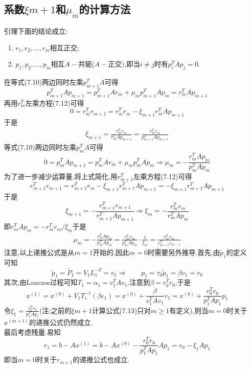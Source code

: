 \documentclass[12pt,a4paper]{article}
\begin{document}
\subsection*{\color{blue}系数$\xi m+1$和$\mu_{m}$的计算方法}
{\color{blue}引理}\qquad 下面的结论成立:
\begin{enumerate}[(1)]
	\item $r_{1}, r_{2}, \ldots, r_{m}$相互正交;
	\item $p_{1}, p_{2}, \dots, p_{m}$相互$A-$共轭($A-$正交),即当$i \neq j$时有$p_{i}^{T} A p_{j}=0$.
\end{enumerate}
在等式(7.10)两边同时左乘$p_{m+1}^{T} A$可得
$$
p_{m+1}^{T} A p_{m+1}=p_{m+1}^{T} A r_{m}+\mu_{m} p_{m+1}^{T} A p_{m}=r_{m}^{T} A p_{m+1}
$$
再用$r_{m}^{T}$左乘方程(7.12)可得
$$
0=r_{m}^{T} r_{m+1}=r_{m}^{T} r_{m}-\xi_{m+1} r_{m}^{T} A p_{m+1}
$$
于是
\begin{align*}
	\xi_{m+1}=\frac{r_{m}^{T} r_{m}}{r_{m}^{T} A p_{m+1}}=\frac{r_{m}^{T} r_{m}}{p_{m+1}^{T} A p_{m+1}}
	\tag{7.13}
\end{align*}
等式(7.10)两边同时左乘$p_{m}^{T} A$可得
$$
0=p_{m}^{T} A p_{m+1}=p_{m}^{T} A r_{m}+\mu_{m} p_{m}^{T} A p_{m} \Longrightarrow \mu_{m}=-\frac{r_{m}^{T} A p_{m}}{p_{m}^{T} A p_{m}}
$$
为了进一步减少运算量,将上式简化.用$r_{m+1}^{T}$左乘方程(7.12)可得
$$
r_{m+1}^{T} r_{m+1}=r_{m+1}^{T} r_{m}-\xi_{m+1} r_{m+1}^{T} A p_{m+1}=-\xi_{m+1} r_{m+1}^{T} A p_{m+1}
$$
于是
$$
\xi_{m+1}=-\frac{r_{m+1}^{T} r_{m+1}}{r_{m+1}^{T} A p_{m+1}} \Longrightarrow \xi_{m}=-\frac{r_{m}^{T} r_{m}}{r_{m}^{T} A p_{m}}
$$
即$r_{m}^{T} A p_{m}=-r_{m}^{T} r_{m} / \xi_{m}$于是
\begin{align*}
	\mu_{m}=-\frac{r_{m}^{T} A p_{m}}{p_{m}^{T} A p_{m}}=\frac{r_{m}^{T} r_{m}}{p_{m}^{T} A p_{m}} \cdot \frac{1}{\xi_{m}}=\frac{r_{m}^{T} r_{m}}{r_{m-1}^{T} r_{m-1}}
	\tag{7.14}
\end{align*}
注意,以上递推公式是从$m=1$开始的.因此$m=0$时需要另外推导.首先,由$\tilde{p}_{1}$的定义可知
$$
\tilde{p}_{1}=\tilde{P}_{1}=V_{1} L_{1}^{-T}=v_{1} \Longrightarrow \quad \quad p_{1}=\tau_{0} \tilde{p}_{1}=\beta v_{1}=r_{0}
$$
其次,由Lanczos过程可知$T_{1}=\alpha_{1}=v_{1}^{T} A v_{1}$.注意到$\beta=r_{0}^{T} r_{0}$,于是
$$
x^{(1)}=x^{(0)}+V_{1} T_{1}^{-1}\left(\beta e_{1}\right)=x^{(0)}+\frac{\beta}{v_{1}^{T} A v_{1}} v_{1}=x^{(0)}+\frac{r_{0}^{T} r_{0}}{p_{1}^{T} A p_{1}} p_{1}
$$
令$\xi_{1}=\frac{r_{0}^{T} r_{0}}{p_{1}^{T} A p_{1}}$(注:之前的$\xi m+1$计算公式(7.13)只对$m \geq 1$有定义),则当$m=0$时关于$x^{(m+1)}$的递推公式仍然成立.\\
最后考虑残量.易知
$$
r_{1}=b-A x^{(1)}=b-A x^{(0)}-\frac{r_{0}^{T} r_{0}}{p_{1}^{T} A p_{1}} A p_{1}=r_{0}-\xi_{1} A p_{1}
$$
即当$m=0$时关于$r_{m+1}$的递推公式也成立.\\
\end{document}

